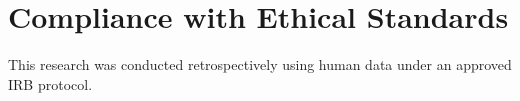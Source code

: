 \section{Compliance with Ethical Standards}
This research was conducted retrospectively using human data under an approved IRB protocol.